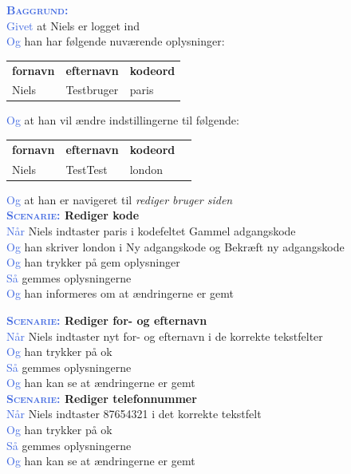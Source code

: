 \textsc{\textcolor{RoyalBlue}{\textbf{Baggrund:}}}\\
\textcolor{RoyalBlue}{Givet} at Niels er logget ind\\
\textcolor{RoyalBlue}{Og} han har følgende nuværende oplysninger:\\
\begin{tabular}{| l | l | l |}
	\textbf{fornavn} & \textbf{efternavn} & \textbf{kodeord} \\
	Niels & Testbruger & paris \\
\end{tabular}
\newline \newline
\textcolor{RoyalBlue}{Og} at han vil ændre indstillingerne til følgende:\\
\begin{tabular}{| l | l | l | l |}
	\textbf{fornavn} & \textbf{efternavn} & \textbf{kodeord} \\
	Niels & TestTest & london \\
\end{tabular}
\newline \newline
\textcolor{RoyalBlue}{Og} at han er navigeret til \emph{rediger bruger siden} \\

\textbf{\textsc{\textcolor{RoyalBlue}{Scenarie:}} Rediger kode}\\
\textcolor{RoyalBlue}{Når} Niels indtaster paris i kodefeltet Gammel adgangskode\\
\textcolor{RoyalBlue}{Og} han skriver london i Ny adgangskode og Bekræft ny adgangskode\\
\textcolor{RoyalBlue}{Og} han trykker på gem oplysninger\\
\textcolor{RoyalBlue}{Så} gemmes oplysningerne\\
\textcolor{RoyalBlue}{Og} han informeres om at ændringerne er gemt

\textbf{\textsc{\textcolor{RoyalBlue}{Scenarie:}} Rediger for- og efternavn}\\
\textcolor{RoyalBlue}{Når} Niels indtaster nyt for- og efternavn i de korrekte tekstfelter\\
\textcolor{RoyalBlue}{Og} han trykker på ok\\
\textcolor{RoyalBlue}{Så} gemmes oplysningerne\\
\textcolor{RoyalBlue}{Og} han kan se at ændringerne er gemt \\

\textbf{\textsc{\textcolor{RoyalBlue}{Scenarie:}} Rediger telefonnummer}\\
\textcolor{RoyalBlue}{Når} Niels indtaster 87654321 i det korrekte tekstfelt\\
\textcolor{RoyalBlue}{Og} han trykker på ok\\
\textcolor{RoyalBlue}{Så} gemmes oplysningerne\\
\textcolor{RoyalBlue}{Og} han kan se at ændringerne er gemt \\

